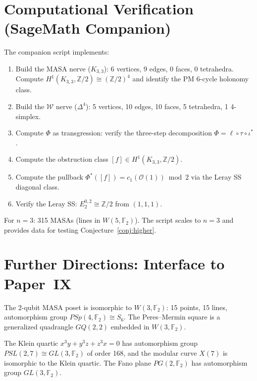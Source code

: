 \documentclass[11pt,a4paper]{article}
\theoremstyle{remark}
\newcommand{\Z}{\mathbb{Z}}
\newcommand{\cO}{\mathcal{O}}
\newcommand{\cW}{\mathcal{W}}
\begin{document}
\section{Computational Verification (SageMath Companion)}
\label{sec:computation}

The companion script implements:
\begin{enumerate}
  \item Build the MASA nerve ($K_{3,3}$): 6 vertices, 9 edges, 0 faces,
    0 tetrahedra. Compute $H^1(K_{3,3}, \Z/2) \cong (\Z/2)^4$ and
    identify the PM 6-cycle holonomy class.
  \item Build the $\cW$ nerve ($\Delta^4$): 5 vertices, 10 edges,
    10 faces, 5 tetrahedra, 1 4-simplex.
  \item Compute $\Phi$ as transgression: verify the three-step
    decomposition $\Phi = \ell \circ \tau \circ \iota^*$.
  \item Compute the obstruction class $[f] \in H^1(K_{3,3}, \Z/2)$.
  \item Compute the pullback $\Phi^*([f]) = c_1(\cO(1)) \bmod 2$ via
    the Leray SS diagonal class.
  \item Verify the Leray SS: $E_2^{0,2} \cong \Z/2$ from $(1,1,1)$.
\end{enumerate}

For $n=3$: 315 MASAs (lines in $W(5, \mathbb{F}_2)$). The script scales
to $n=3$ and provides data for testing Conjecture~\ref{conj:higher}.

\section{Further Directions: Interface to Paper~IX}
\label{sec:future}

The 2-qubit MASA poset is isomorphic to $W(3, \mathbb{F}_2)$:
15 points, 15 lines, automorphism group $PSp(4, \mathbb{F}_2) \cong S_6$.
The Peres--Mermin square is a generalized quadrangle $GQ(2, 2)$ embedded
in $W(3, \mathbb{F}_2)$.

The Klein quartic $x^3 y + y^3 z + z^3 x = 0$ has automorphism group
$PSL(2, 7) \cong GL(3, \mathbb{F}_2)$ of order 168, and the modular curve
$X(7)$ is isomorphic to the Klein quartic. The Fano plane
$PG(2, \mathbb{F}_2)$ has automorphism group $GL(3, \mathbb{F}_2)$.
\end{document}

